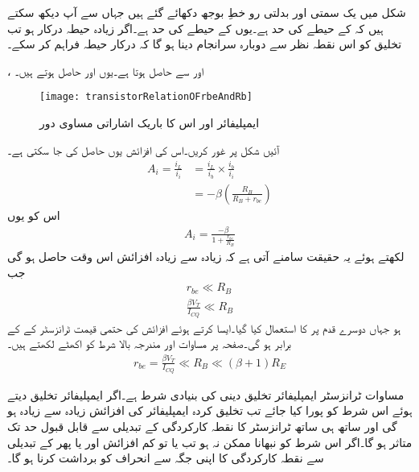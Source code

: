 شکل  میں یک سمتی اور بدلتی رو خطِ بوجھ  دکھائے گئے ہیں جہاں سے آپ دیکھ سکتے ہیں کہ   کے حیطے کی حد   ہے۔یوں  کے حیطے کی حد  ہے۔اگر زیادہ حیطہ درکار ہو تب تخلیق کو اس نقطہ نظر سے دوبارہ سرانجام دینا ہو گا کہ  درکار حیطہ فراہم کر سکے۔

،  اور  سے  حاصل ہوتا ہے۔یوں  اور  حاصل ہوتے ہیں۔
\begin{figure}
\centering
\texttt{[image: transistorRelationOFrbeAndRb]}
\caption{ایمپلیفائر اور اس کا باریک اشاراتی مساوی دور}
\label{شکل_ٹرانزسٹر_افزائش_بڑھانے_کی_شرط}
\end{figure}
آئیں شکل  پر غور کریں۔اس کی افزائش  یوں حاصل کی جا سکتی ہے۔
\begin{align*}
A_i=\frac{i_L}{i_i}&= \frac{i_L}{i_b} \times \frac{i_b}{i_i}\\
&=-\beta \left(\frac{R_B}{R_B+r_{be}} \right)
\end{align*}
اس کو یوں
\begin{align*}
A_i=\frac{-\beta}{1+\frac{r_{be}}{R_B}}
\end{align*}
لکھتے ہوئے یہ حقیقت سامنے آتی ہے کہ زیادہ سے زیادہ افزائش اس وقت حاصل ہو گی جب
\begin{align}
r_{be} \ll R_B\\
\frac{\beta V_T}{I_{CQ}} \ll R_B
\end{align}
ہو جہاں دوسرے قدم پر  کا استعمال کیا گیا۔ایسا کرتے ہوئے افزائش کی حتمی قیمت ٹرانزسٹر کے  کے برابر ہو گی۔صفحہ  پر مساوات  اور مندرجہ بالا شرط کو اکھٹے لکھتے ہیں۔
\begin{align}\label{مساوات_ٹرانزسٹر_ایمپلیفائر_تخلیق_کی_شرط}
r_{be} =\frac{\beta V_T}{I_{CQ}} \ll R_B \ll \left(\beta+1\right) R_E
\end{align}

مساوات  ٹرانزسٹر ایمپلیفائر تخلیق دینی کی بنیادی شرط ہے۔اگر ایمپلیفائر تخلیق دیتے ہوئے اس شرط کو پورا کیا جائے تب تخلیق کردہ ایمپلیفائر کی افزائش زیادہ سے زیادہ ہو گی اور ساتھ ہی ساتھ ٹرانزسٹر کا نقطہ کارکردگی  کے تبدیلی سے قابل قبول حد تک متاثر ہو گا۔اگر اس شرط کو نبھانا ممکن نہ ہو تب یا تو کم افزائش  اور یا پھر  کے تبدیلی سے نقطہ کارکردگی کا اپنی جگہ سے انحراف کو برداشت کرنا ہو گا۔


